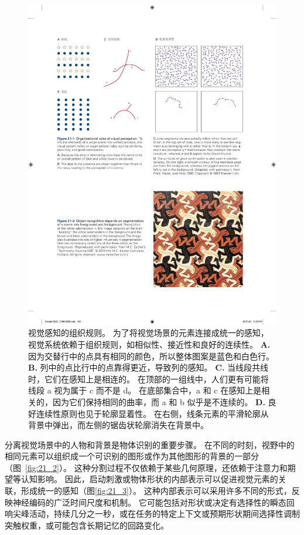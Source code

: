 \begin{figure}[htbp]
	\centering
	\includegraphics[width=1.0\linewidth]{chap21/fig_21_1}
	\caption{视觉感知的组织规则。
		为了将视觉场景的元素连接成统一的感知，视觉系统依赖于组织规则，如相似性、接近性和良好的连续性。
		\textbf{A.} 因为交替行中的点具有相同的颜色，所以整体图案是蓝色和白色行。
		\textbf{B.} 列中的点比行中的点靠得更近，导致列的感知。
		\textbf{C.} 当线段共线时，它们在感知上是相连的。
		在顶部的一组线中，人们更有可能将线段 a 视为属于 c 而不是 d。
		在底部集合中，a 和 c 在感知上是相关的，因为它们保持相同的曲率，而 a 和 b 似乎是不连续的。
		\textbf{D.} 良好连续性原则也见于轮廓显着性。
		在右侧，线条元素的平滑轮廓从背景中弹出，而左侧的锯齿状轮廓消失在背景中\cite{field1993contour}。}
	\label{fig:21_1}
\end{figure}


分离视觉场景中的人物和背景是物体识别的重要步骤。
在不同的时刻，视野中的相同元素可以组织成一个可识别的图形或作为其他图形的背景的一部分（图~\ref{fig:21_2}）。
这种分割过程不仅依赖于某些几何原理，还依赖于注意力和期望等认知影响。
因此，启动刺激或物体形状的内部表示可以促进视觉元素的关联，形成统一的感知（图\ref{fig:21_3}）。
这种内部表示可以采用许多不同的形式，反映神经编码的广泛时间尺度和机制。
它可能包括对形状或决定有选择性的瞬态回响尖峰活动，持续几分之一秒，或在任务的特定上下文或预期形状期间选择性调制突触权重，或可能包含长期记忆的回路变化。


